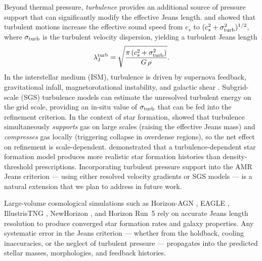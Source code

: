 \documentclass[fleqn,usenatbib]{mnras}
\newcommand{\lJ}{\lambda_{\rm J}}
\begin{document}
Beyond thermal pressure, \emph{turbulence} provides an additional
source of pressure support that can significantly modify the effective
Jeans length.  \citet{Chandrasekhar1951} and \citet{Bonazzola1987}
showed that turbulent motions increase the effective sound speed from
$c_s$ to $(c_s^2 + \sigma_{\rm turb}^2)^{1/2}$, where $\sigma_{\rm
turb}$ is the turbulent velocity dispersion, yielding a turbulent
Jeans length
\begin{equation}
  \lJ^{\rm turb} =
  \sqrt{\frac{\pi\,(c_s^2 + \sigma_{\rm turb}^2)}{G\,\rho}}.
  \label{eq:jeans_turb}
\end{equation}
In the interstellar medium (ISM), turbulence is driven by supernova
feedback, gravitational infall, magnetorotational instability, and
galactic shear \citep{Robertson2008, Kim2017, Hopkins2018}.
Subgrid-scale (SGS) turbulence models
\citep{Schmidt2006, Schmidt2011, Rennehan2021} can estimate the
unresolved turbulent energy on the grid scale, providing an in-situ
value of $\sigma_{\rm turb}$ that can be fed into the refinement
criterion.  In the context of star formation,
\citet{Federrath2012} showed that turbulence
simultaneously \emph{supports} gas on large scales (raising the
effective Jeans mass) and \emph{compresses} gas locally (triggering
collapse in overdense regions), so the net effect on refinement is
scale-dependent.  \citet{Semenov2016} demonstrated that a
turbulence-dependent star formation model produces more realistic
star formation histories than density-threshold prescriptions.
Incorporating turbulent pressure support into the AMR Jeans criterion
--- using either resolved velocity gradients or SGS models --- is a
natural extension that we plan to address in future work.

Large-volume cosmological simulations such as Horizon-AGN
\citep{Dubois2014}, EAGLE \citep{Schaye2015}, IllustrisTNG
\citep{Pillepich2018}, NewHorizon \citep{Dubois2021}, and Horizon
Run~5 \citep[HR5;][]{Lee2021} rely on accurate Jeans length
resolution to produce converged star formation rates and galaxy
properties.  Any systematic error in the Jeans criterion ---
whether from the holdback, cooling inaccuracies, or the neglect of
turbulent pressure --- propagates into the predicted stellar masses,
morphologies, and feedback histories.
\end{document}
